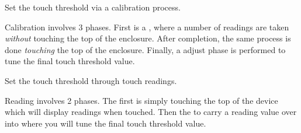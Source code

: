 
 \par\medskip

Set the touch threshold via a calibration process.

\par\medskip

Calibration involves \num{3} phases.  First is a , where a number of
readings are taken \textit{without} touching the top of the enclosure.  After
completion, the same process is done \textit{touching} the top of the enclosure.
Finally, a  adjust phase is performed to tune the final touch threshold
value.


 \par\medskip

Set the touch threshold through touch readings.

\par\medskip

Reading involves \num{2} phases.  The first is simply touching the top of the
device which will display readings when touched. Then  the  to
carry a reading value over into  where you will tune the final touch
threshold value.


